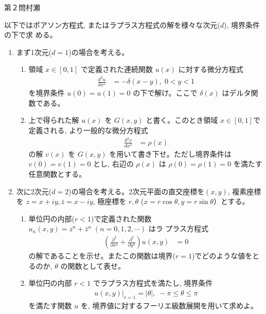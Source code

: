 \begin{question}{第２問}{村瀬}

以下ではポアソン方程式, またはラプラス方程式の解を様々な次元($d$), 境界条件の下で求
める。

\begin{enumerate}
\item まず1次元($d=1$)の場合を考える。
  \begin{enumerate}
  \item 領域 $x\in[0,1]$ で定義された連続関数 $u(x)$ に対する微分方程式
    \begin{align*}
      \frac{d^2 u}{dx^2} &= -\delta(x-y),\; 0<y<1
    \end{align*}
    を境界条件 $u(0)=u(1)=0$ の下で解け。ここで $\delta(x)$ はデルタ関数である。
  \item 上で得られた解 $u(x)$ を $G(x,y)$ と書く。このとき領域 $x\in[0,1]$で定義される,
    より一般的な微分方程式
    \begin{align*}
      \frac{d^2 v}{dx^2} &= \rho(x)
    \end{align*}
    の解 $v(x)$ を $G(x, y)$ を用いて書き下せ。ただし境界条件は $v(0)=v(1)=0$ とし,
    右辺の $\rho(x)$ は $\rho(0)=\rho(1)=0$ を満たす任意関数とする。
  \end{enumerate}

\item 次に2次元($d=2$)の場合を考える。2次元平面の直交座標を$(x,y)$, 複素座標を
  $z=x+iy, \bar z = x-iy$, 極座標を $r, \theta$ ($x=r\cos\theta, y=r\sin\theta$）とする。
  \begin{enumerate}
  \item
    単位円の内部($r<1$)で定義された関数 $u_n(x,y)=z^n + \bar z^n\; (n=0, 1, 2, \cdots)$ はラ
    プラス方程式
    \begin{align*}
      \left(\frac{\partial^2}{\partial x^2} + \frac{\partial^2}{\partial y^2}\right)u(x,y) &= 0
    \end{align*}
    の解であることを示せ。またこの関数は境界($r=1$)でどのような値をとるのか, 
    $\theta$ の関数として表せ。
  \item
    単位円の内部 $r<1$ でラプラス方程式を満たし, 境界条件
    \begin{align*}
      u(x,y)\bigr|_{r=1}=|\theta|,\; -\pi \le \theta \le \pi
    \end{align*}
    を満たす関数 $u$ を, 境界値に対するフーリエ級数展開を用いて求めよ。
  \end{enumerate}


\end{enumerate}
\end{question}
